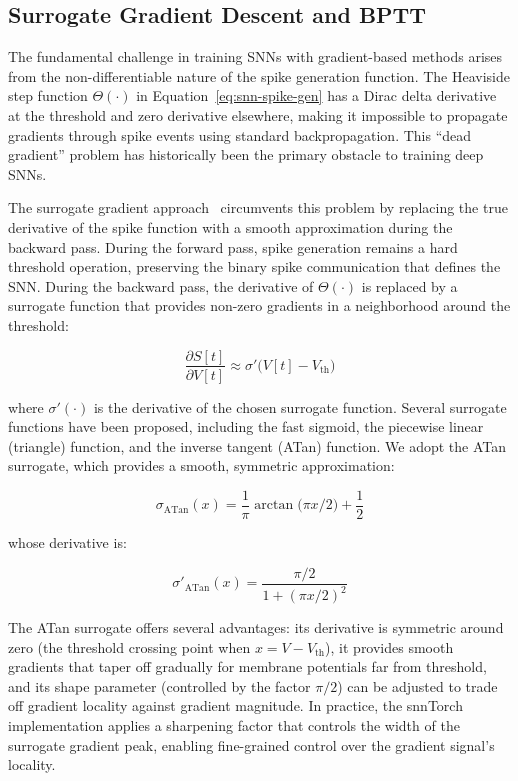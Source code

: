 \subsection{Surrogate Gradient Descent and BPTT}

The fundamental challenge in training SNNs with gradient-based methods arises from the non-differentiable nature of the spike generation function. The Heaviside step function $\Theta(\cdot)$ in Equation~\ref{eq:snn-spike-gen} has a Dirac delta derivative at the threshold and zero derivative elsewhere, making it impossible to propagate gradients through spike events using standard backpropagation. This ``dead gradient'' problem has historically been the primary obstacle to training deep SNNs.

The surrogate gradient approach~\cite{zenke2021remarkable,eshraghian2021training} circumvents this problem by replacing the true derivative of the spike function with a smooth approximation during the backward pass. During the forward pass, spike generation remains a hard threshold operation, preserving the binary spike communication that defines the SNN. During the backward pass, the derivative of $\Theta(\cdot)$ is replaced by a surrogate function that provides non-zero gradients in a neighborhood around the threshold:

\begin{equation}
\frac{\partial S[t]}{\partial V[t]} \approx \sigma'\bigl(V[t] - V_{\text{th}}\bigr)
\label{eq:snn-surrogate-general}
\end{equation}

where $\sigma'(\cdot)$ is the derivative of the chosen surrogate function. Several surrogate functions have been proposed, including the fast sigmoid, the piecewise linear (triangle) function, and the inverse tangent (ATan) function. We adopt the ATan surrogate, which provides a smooth, symmetric approximation:

\begin{equation}
\sigma_{\text{ATan}}(x) = \frac{1}{\pi} \arctan\bigl(\pi x / 2\bigr) + \frac{1}{2}
\label{eq:snn-atan-surrogate}
\end{equation}

whose derivative is:

\begin{equation}
\sigma'_{\text{ATan}}(x) = \frac{\pi / 2}{1 + (\pi x / 2)^2}
\label{eq:snn-atan-derivative}
\end{equation}

The ATan surrogate offers several advantages: its derivative is symmetric around zero (the threshold crossing point when $x = V - V_{\text{th}}$), it provides smooth gradients that taper off gradually for membrane potentials far from threshold, and its shape parameter (controlled by the factor $\pi/2$) can be adjusted to trade off gradient locality against gradient magnitude. In practice, the snnTorch implementation applies a sharpening factor that controls the width of the surrogate gradient peak, enabling fine-grained control over the gradient signal's locality.

